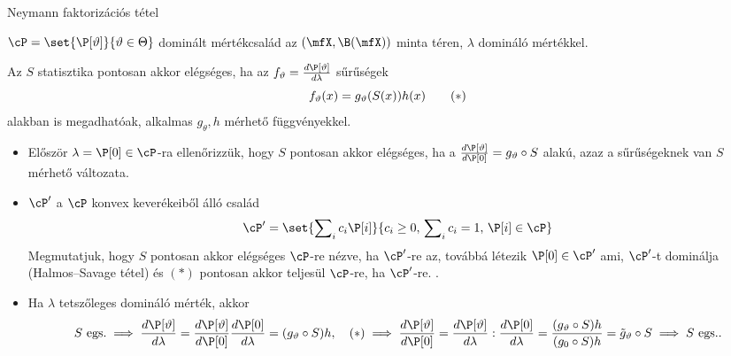 \documentclass[aspectratio=169,notheorems,9pt,\option]{beamer}
\begin{document}
\begin{frame}{Neymann faktorizációs tétel}

  \begin{theorem}
    $\cP=\set{\P[\theta]}{\theta\in\Theta}$ dominált mértékcsalád az 
    $(\mfX,\B(\mfX))$ minta téren, $\lambda$ domináló mértékkel. 
    
    Az $S$  statisztika pontosan akkor elégséges, ha az 
    $f_\theta=\frac{d\P[\theta]}{d\lambda}$ 
    sűrűségek
    \begin{displaymath}
      f_{\theta}(x)=g_{\theta}(S(x))h(x)  \tag{\hbox{${*}$}}
    \end{displaymath}
    alakban is megadhatóak, 
    alkalmas $g_\theta,h$ mérhető függvényekkel.
  \end{theorem}
  \begin{itemize}
    \item Először $\lambda=\P[0]\in\cP$-ra ellenőrizzük, hogy $S$ pontosan 
    akkor elégséges, ha a $\frac{d\P[\theta]}{d\P[0]}=g_\theta\circ S$ alakú, azaz
    a sűrűségeknek van $S$ mérhető változata.
    \item $\cP'$ a $\cP$ konvex keverékeiből álló család  
    \begin{displaymath}
      \cP'=\set{\sum\nolimits_i c_i\P[i]}{c_i\geq0,\,\sum\nolimits_i c_i=1,\,\P[i]\in\cP}  
    \end{displaymath}
    Megmutatjuk, hogy $S$ pontosan akkor elégséges $\cP$-re nézve, ha $\cP'$-re az, 
    továbbá létezik $\P[0]\in \cP'$ ami, $\cP'$-t dominálja (Halmos--Savage tétel) 
    és $(*)$ pontosan akkor teljesül $\cP$-re, ha $\cP'$-re. .
    \item Ha $\lambda$ tetszőleges domináló mérték, akkor 
    \begin{displaymath}
      \text{$S$ egs.}\implies\frac{d\P[\theta]}{d\lambda}
      =\frac{d\P[\theta]}{d\P[0]}\frac{d\P[0]}{d\lambda}
      =(g_\theta\circ S) h,
      \quad\text{$(*)$}\implies
      \frac{d\P[\theta]}{d\P[0]}=\frac{d\P[\theta]}{d\lambda}:\frac{d\P[0]}{d\lambda}
      =\frac{(g_\theta\circ S) h}{(g_0\circ S) h}
      =\tilde g_\theta\circ S\implies \text{$S$ egs.}.
    \end{displaymath}
  \end{itemize}
  

\end{frame}
\end{document}
